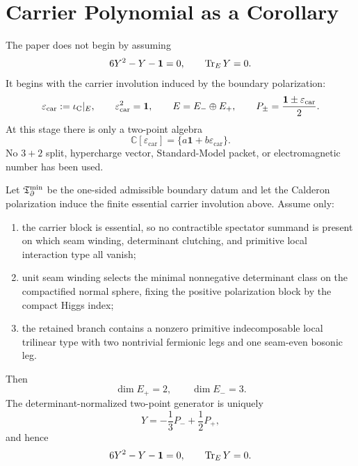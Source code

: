 \documentclass[11pt,a4paper]{article}
\begin{document}
\tableofcontents

\section{Carrier Polynomial as a Corollary}

The paper does not begin by assuming
\[
6Y^2-Y-\mathbf 1=0,\qquad \operatorname{Tr}_EY=0.
\]
It begins with the carrier involution induced by the boundary polarization:
\[
\varepsilon_{\mathrm{car}}:=\iota_{\mathrm C}|_E,
\qquad
\varepsilon_{\mathrm{car}}^2=\mathbf 1,
\qquad
E=E_-\oplus E_+,
\qquad
P_\pm=\frac{\mathbf 1\pm\varepsilon_{\mathrm{car}}}{2}.
\]
At this stage there is only a two-point algebra
\[
\mathbb C[\varepsilon_{\mathrm{car}}]=\{a\mathbf 1+b\varepsilon_{\mathrm{car}}\}.
\]
No $3+2$ split, hypercharge vector, Standard-Model packet, or electromagnetic number has been
used.

\begin{theorem}
Let $\mathfrak T_{\partial}^{\min}$ be the one-sided admissible boundary datum and let the Calderon polarization induce
the finite essential carrier involution above. Assume only:
\begin{enumerate}[label=(\roman*), leftmargin=1.7em]
    \item the carrier block is essential, so no contractible spectator summand is present on which
    seam winding, determinant clutching, and primitive local interaction type all vanish;
    \item unit seam winding selects the minimal nonnegative determinant class on the compactified
    normal sphere, fixing the positive polarization block by the compact Higgs index;
    \item the retained branch contains a nonzero primitive indecomposable local trilinear type with
    two nontrivial fermionic legs and one seam-even bosonic leg.
\end{enumerate}
Then
\[
\dim E_+=2,\qquad \dim E_-=3.
\]
The determinant-normalized two-point generator is uniquely
\[
Y=-\frac13P_-+\frac12P_+,
\]
and hence
\[
6Y^2-Y-\mathbf 1=0,\qquad \operatorname{Tr}_EY=0.
\]
\end{theorem}
\end{document}
